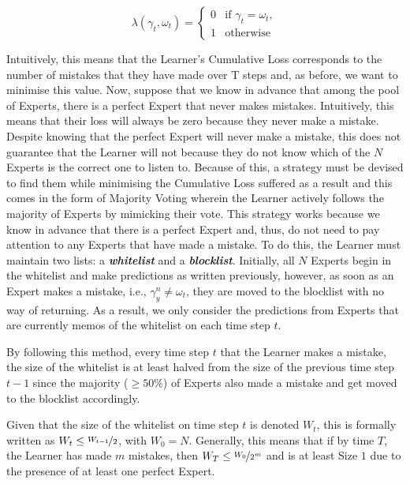 \begin{equation}
    \lambda(\gamma_t, \omega_t) = \begin{cases}
        0 & \text{if } \gamma_t = \omega_t,
        \\ 1 & \text{otherwise}
    \end{cases}
\end{equation}

Intuitively, this means that the Learner’s Cumulative Loss corresponds to the number of mistakes that they have made over T steps and, as before, we want to minimise this value.
Now, suppose that we know in advance that among the pool of Experts, there is a perfect Expert that never makes mistakes. Intuitively, this means that their loss will always be zero because they never make a mistake. Despite knowing that the perfect Expert will never make a mistake, this does not guarantee that the Learner will not because they do not know which of the $N$ Experts is the correct one to listen to. Because of this, a strategy must be devised to find them while minimising the Cumulative Loss suffered as a result and this comes in the form of Majority Voting wherein the Learner actively follows the majority of Experts by mimicking their vote.
This strategy works because we know in advance that there is a perfect Expert and, thus, do not need to pay attention to any Experts that have made a mistake. To do this, the Learner must maintain two lists: a \textbf{\textit{whitelist}} and a \textbf{\textit{blocklist}}. Initially, all $N$ Experts begin in the whitelist and make predictions as written previously, however, as soon as an Expert makes a mistake, i.e., $\gamma^n_y \neq \omega_t$, they are moved to the blocklist with no way of returning. As a result, we only consider the predictions from Experts that are currently memos of the whitelist on each time step $t$.

By following this method, every time step $t$ that the Learner makes a mistake, the size of the whitelist is at least halved from the size of the previous time step $t - 1$ since the majority ($\geq 50\%$) of Experts also made a mistake and get moved to the blocklist accordingly.

Given that the size of the whitelist on time step $t$ is denoted $W_t$, this is formally written as $W_t \leq \nicefrac{W_{t-1}}{2}$, with $W_0 = N$. Generally, this means that if by time $T$, the Learner has made $m$ mistakes, then $W_T \leq \nicefrac{W_0}{2^m}$ and is at least Size $1$ due to the presence of at least one perfect Expert.

